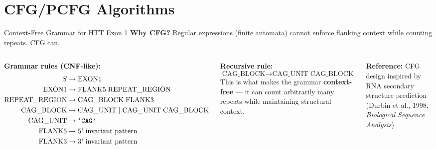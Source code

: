 \documentclass[aspectratio=169,11pt]{beamer}
\begin{document}
\section{CFG/PCFG Algorithms}

\begin{frame}{Context-Free Grammar for HTT Exon 1}
    \textbf{Why CFG?} Regular expressions (finite automata) cannot enforce flanking context while counting repeats. CFG can.

    \begin{columns}[T]
        \textbf{Grammar rules (CNF-like):}
        \begin{align*}
            S &\to \text{EXON1} \\
            \text{EXON1} &\to \text{FLANK5}\;\text{REPEAT\_REGION} \\
            \text{REPEAT\_REGION} &\to \text{CAG\_BLOCK}\;\text{FLANK3} \\
            \text{CAG\_BLOCK} &\to \text{CAG\_UNIT} \mid \text{CAG\_UNIT}\;\text{CAG\_BLOCK} \\
            \text{CAG\_UNIT} &\to \texttt{`CAG'} \\
            \text{FLANK5} &\to \text{5\textquotesingle{} invariant pattern} \\
            \text{FLANK3} &\to \text{3\textquotesingle{} invariant pattern}
        \end{align*}

        \textbf{Recursive rule:}
        \[
        \text{CAG\_BLOCK} \to \text{CAG\_UNIT}\;\text{CAG\_BLOCK}
        \]
        This is what makes the grammar \textbf{context-free} --- it can count arbitrarily many repeats while maintaining structural context.

        \vspace{0.5cm}
        \textbf{Reference:} CFG design inspired by RNA secondary structure prediction (Durbin et al., 1998, \textit{Biological Sequence Analysis})
    \end{columns}
\end{frame}
\end{document}
